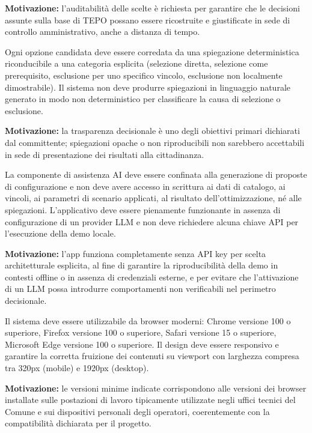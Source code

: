 \textbf{Motivazione:} l'auditabilità delle scelte è richiesta per garantire che le decisioni assunte sulla base di TEPO possano essere ricostruite e giustificate in sede di controllo amministrativo, anche a distanza di tempo.

 \label{rnf:interpretabilita}
Ogni opzione candidata deve essere corredata da una spiegazione deterministica riconducibile a una categoria esplicita (selezione diretta, selezione come prerequisito, esclusione per uno specifico vincolo, esclusione non localmente dimostrabile). Il sistema non deve produrre spiegazioni in linguaggio naturale generato in modo non deterministico per classificare la causa di selezione o esclusione.

\textbf{Motivazione:} la trasparenza decisionale è uno degli obiettivi primari dichiarati dal committente; spiegazioni opache o non riproducibili non sarebbero accettabili in sede di presentazione dei risultati alla cittadinanza.

 \label{rnf:ai_isolamento}
La componente di assistenza AI deve essere confinata alla generazione di proposte di configurazione e non deve avere accesso in scrittura ai dati di catalogo, ai vincoli, ai parametri di scenario applicati, al risultato dell'ottimizzazione, né alle spiegazioni. L'applicativo deve essere pienamente funzionante in assenza di configurazione di un provider LLM e non deve richiedere alcuna chiave API per l'esecuzione della demo locale.

\textbf{Motivazione:} l'app funziona completamente senza API key per scelta architetturale esplicita, al fine di garantire la riproducibilità della demo in contesti offline o in assenza di credenziali esterne, e per evitare che l'attivazione di un LLM possa introdurre comportamenti non verificabili nel perimetro decisionale.

 \label{rnf:compatibilita}
Il sistema deve essere utilizzabile da browser moderni: Chrome versione 100 o superiore, Firefox versione 100 o superiore, Safari versione 15 o superiore, Microsoft Edge versione 100 o superiore. Il design deve essere responsivo e garantire la corretta fruizione dei contenuti su viewport con larghezza compresa tra 320px (mobile) e 1920px (desktop).

\textbf{Motivazione:} le versioni minime indicate corrispondono alle versioni dei browser installate sulle postazioni di lavoro tipicamente utilizzate negli uffici tecnici del Comune e sui dispositivi personali degli operatori, coerentemente con la compatibilità dichiarata per il progetto.

